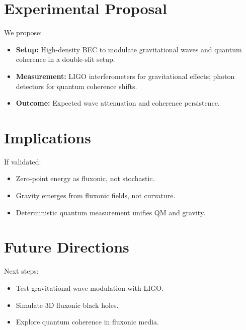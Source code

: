 \documentclass{article}
\begin{document}
\section{Experimental Proposal}
We propose:
\begin{itemize}
    \item \textbf{Setup:} High-density BEC to modulate gravitational waves and quantum coherence in a double-slit setup.
    \item \textbf{Measurement:} LIGO interferometers for gravitational effects; photon detectors for quantum coherence shifts.
    \item \textbf{Outcome:} Expected wave attenuation and coherence persistence.
\end{itemize}

\section{Implications}
If validated:
\begin{itemize}
    \item Zero-point energy as fluxonic, not stochastic.
    \item Gravity emerges from fluxonic fields, not curvature.
    \item Deterministic quantum measurement unifies QM and gravity.
\end{itemize}

\section{Future Directions}
Next steps:
\begin{itemize}
    \item Test gravitational wave modulation with LIGO.
    \item Simulate 3D fluxonic black holes.
    \item Explore quantum coherence in fluxonic media.
\end{itemize}
\end{document}

